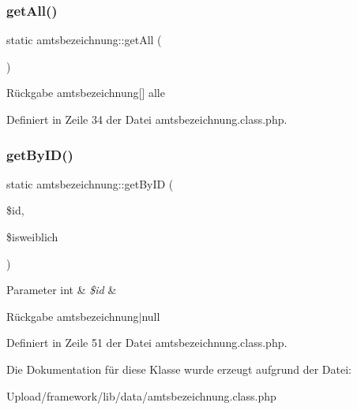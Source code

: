 \subsubsection{\texorpdfstring{get\+All()}{getAll()}}
{\footnotesize\ttfamily static amtsbezeichnung\+::get\+All (\begin{DoxyParamCaption}{ }\end{DoxyParamCaption})\hspace{0.3cm}{\ttfamily [static]}}

\begin{DoxyReturn}{Rückgabe}
amtsbezeichnung\mbox{[}\mbox{]} alle 
\end{DoxyReturn}


Definiert in Zeile 34 der Datei amtsbezeichnung.\+class.\+php.

\mbox{\label{classamtsbezeichnung_a742c93108e548b9b445eb9bde017ec45}} 
\subsubsection{\texorpdfstring{get\+By\+I\+D()}{getByID()}}
{\footnotesize\ttfamily static amtsbezeichnung\+::get\+By\+ID (\begin{DoxyParamCaption}\item[{}]{\$id,  }\item[{}]{\$isweiblich }\end{DoxyParamCaption})\hspace{0.3cm}{\ttfamily [static]}}


\begin{DoxyParams}[1]{Parameter}
int & {\em \$id} & \\
\hline
\end{DoxyParams}
\begin{DoxyReturn}{Rückgabe}
amtsbezeichnung$\vert$null 
\end{DoxyReturn}


Definiert in Zeile 51 der Datei amtsbezeichnung.\+class.\+php.



Die Dokumentation für diese Klasse wurde erzeugt aufgrund der Datei\+:\begin{DoxyCompactItemize}
\item 
Upload/framework/lib/data/amtsbezeichnung.\+class.\+php\end{DoxyCompactItemize}
